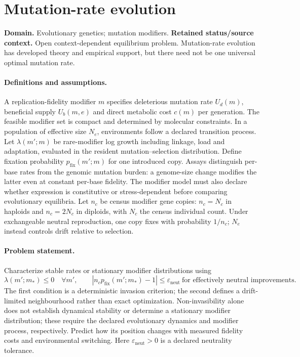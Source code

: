 \documentclass[11pt]{article}
\begin{document}
\section*{Mutation-rate evolution}
\label{prob:169}
\label{rank:159}
\par\smallskip

\noindent\textbf{Domain.} Evolutionary genetics; mutation modifiers. \quad \textbf{Retained status/source context.} Open context-dependent equilibrium problem. Mutation-rate evolution has developed theory and empirical support, but there need not be one universal optimal mutation rate.
\paragraph{Definitions and assumptions.} A replication-fidelity modifier $m$ specifies deleterious mutation rate $U_d(m)$, beneficial supply $U_b(m,e)$ and direct metabolic cost $c(m)$ per generation. The feasible modifier set is compact and determined by molecular constraints. In a population of effective size $N_e$, environments follow a declared transition process. Let $\lambda(m';m)$ be rare-modifier log growth including linkage, load and adaptation, evaluated in the resident mutation--selection distribution. Define fixation probability $p_{\mathrm{fix}}(m';m)$ for one introduced copy. Assays distinguish per-base rates from the genomic mutation burden: a genome-size change modifies the latter even at constant per-base fidelity. The modifier model must also declare whether expression is constitutive or stress-dependent before comparing evolutionary equilibria. Let $n_c$ be census modifier gene copies: $n_c=N_c$ in haploids and $n_c=2N_c$ in diploids, with $N_c$ the census individual count. Under exchangeable neutral reproduction, one copy fixes with probability $1/n_c$; $N_e$ instead controls drift relative to selection.
\paragraph{Problem statement.} Characterize stable rates or stationary modifier distributions using
\[
 \lambda(m';m_*)\le0\quad\forall m',
 \qquad
 |n_c p_{\mathrm{fix}}(m';m_*)-1|\le\varepsilon_{\mathrm{neut}}
 \ \text{for effectively neutral improvements}.
\]
The first condition is a deterministic invasion criterion; the second defines a drift-limited neighbourhood rather than exact optimization. Non-invasibility alone does not establish dynamical stability or determine a stationary modifier distribution; these require the declared evolutionary dynamics and modifier process, respectively. Predict how its position changes with measured fidelity costs and environmental switching. Here $\varepsilon_{\mathrm{neut}}>0$ is a declared neutrality tolerance.
\end{document}
